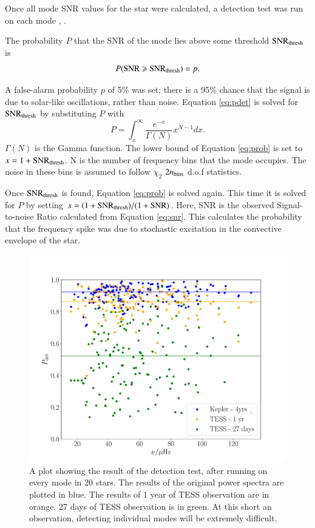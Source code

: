 \documentclass[a4paper,fleqn,usenatbib,useAMS]{mnras}
\begin{document}
Once all mode SNR values for the star were calculated, a detection test was run on each mode \citep{chaplin_predicting_2011}, \citep{campante_asteroseismic_2016}.

The probability $P$ that the SNR of the mode lies above some threshold ${\rm SNR_{thresh}}$ is
\begin{equation}
\label{eq:pdet}
{P \rm ({ SNR \geq SNR_{thresh}})} =  p .
\end{equation}

A false-alarm probability $p$ of 5\% was set; there is a 95\% chance that the signal is due to solar-like oscillations, rather than noise. Equation \ref{eq:pdet} is solved for $\rm SNR_{thresh}$ by substituting $P$ with
\begin{equation}
\label{eq:prob}
P = \int_{x}^{\infty} \frac{e^{-x}}{\Gamma(N)} x^{N-1} dx .
\end{equation}
$\Gamma(N)$ is the Gamma function. The lower bound of Equation \ref{eq:prob} is set to $x=1+{\rm SNR_{thresh}}$. N is the number of frequency bins that the mode occupies. The noise in these bins is assumed to follow $\chi_{2}$ $2n_{\rm bins}$ d.o.f statistics. 

Once $\rm SNR_{thresh}$ is found, Equation \ref{eq:prob} is solved again. This time it is solved for $P$ by setting $x=(1+{\rm SNR_{thresh}})/(1+{\rm SNR})$. Here, SNR is the observed Signal-to-noise Ratio calculated from Equation \ref{eq:snr}. This calculates the probability that the frequency spike was due to stochastic excitation in the convective envelope of the star.

\begin{figure}
	\centering
	\includegraphics[scale=0.3]{DetTest_Diagnostic_plot3.pdf}
	\caption{A plot showing the result of the detection test, after running on every mode in 20 stars. The results of the original power spectra are plotted in blue. The results of 1 year of TESS observation are in orange. 27 days of TESS observation is in green. At this short an observation, detecting individual modes will be extremely difficult.}	
	\label{fig: modes}
\end{figure}
\end{document}
